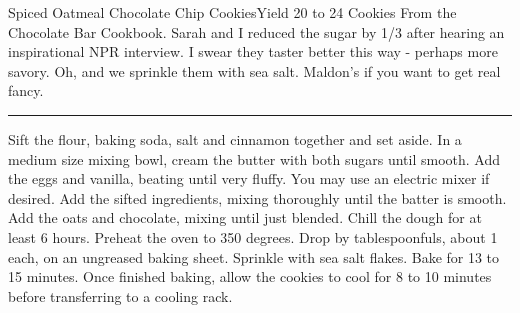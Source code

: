 \begin{recipe}{Spiced Oatmeal Chocolate Chip Cookies}{Yield 20 to 24 Cookies}{}
\freeform
From the Chocolate Bar Cookbook. Sarah and I reduced the sugar by 1/3
after hearing an inspirational NPR interview. I swear they taster
better this way - perhaps more savory. Oh, and we sprinkle them with
sea salt. Maldon's if you want to get real fancy.\\
\rule{\textwidth}{0.05pt}
Sift the flour, baking soda, salt and cinnamon together and set aside.
In a medium size mixing bowl, cream the butter with both sugars until
smooth.
Add the eggs and vanilla, beating until very fluffy. You may use an
electric mixer if desired.
Add the sifted ingredients, mixing thoroughly until the batter is
smooth. Add the oats and chocolate, mixing until just blended. Chill
the dough for at least 6 hours.
\freeform
Preheat the oven to 350 degrees. Drop by tablespoonfuls, about 1
each, on an ungreased baking sheet. Sprinkle with sea salt
flakes. Bake for 13 to 15 minutes. Once finished baking, allow the
cookies to cool for 8 to 10 minutes before transferring to a cooling
rack.
\end{recipe}